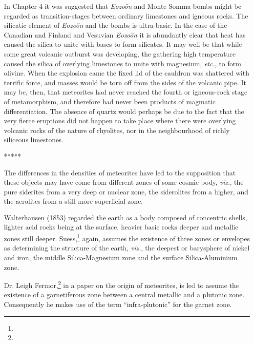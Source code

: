 \documentclass[a4paper, 12pt, oneside]{article}
\begin{document}
In Chapter 4 it was suggested that \emph{Eozoön} and Monte Somma bombs might be regarded as transition-stages between ordinary limestones and igneous rocks. The silicatic element of \emph{Eozoön} and the bombs is ultra-basic. In the case of the Canadian and Finland and Vesuvian \emph{Eozoön} it is abundantly clear that heat has caused the silica to unite with bases to form silicates. It may well be that while some great volcanic outburst was developing, the gathering high temperature caused the silica of overlying limestones to unite with magnesium, \emph{etc.}, to form olivine. When the explosion came the fixed lid of the cauldron was shattered with terrific force, and masses would be torn off from the sides of the volcanic pipe. It may be, then, that meteorites had never reached the fourth or igneous-rock stage of metamorphism, and therefore had never been products of magmatic differentiation. The absence of quartz would perhaps be due to the fact that the very fierce eruptions did not happen to take place where there were overlying volcanic rocks of the nature of rhyolites, nor in the neighbourhood of richly siliceous limestones.

\centerline{*\hspace{15mm}*\hspace{15mm}*\hspace{15mm}*\hspace{15mm}*}
\bigskip

The differences in the densities of meteorites have led to the supposition that these objects may have come from different zones of some cosmic body, \emph{viz.}, the pure siderites from a very deep or nuclear zone, the siderolites from a higher, and the aerolites from a still more superficial zone.

Walterhausen (1853) regarded the earth as a body composed of concentric shells, lighter acid rocks being at the surface, heavier basic rocks deeper and metallic zones still deeper. Suess,\footnote{} again, assumes the existence of three zones or envelopes as determining the structure of the earth, \emph{viz.}, the deepest or barysphere of nickel and iron, the middle Silica-Magnesium zone and the surface Silica-Aluminium zone.

Dr. Leigh Fermor,\footnote{} in a paper on the origin of meteorites, is led to assume the existence of a garnetiferous zone between a central metallic and a plutonic zone. Consequently he makes use of the term ``infra-plutonic'' for the garnet zone.
\end{document}
